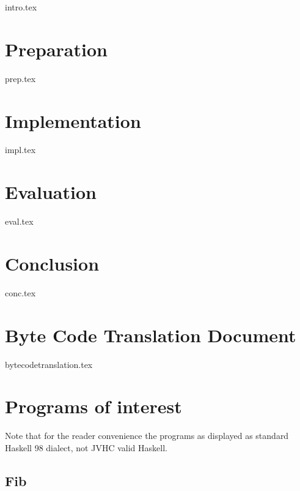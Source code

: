 \documentclass[12pt,a4paper,twoside,openright]{book}
\numberwithin{subcase}{case}
\begin{document}
{intro.tex}

\chapter{Preparation}

{prep.tex}

\chapter{Implementation}

{impl.tex}

\chapter{Evaluation}

{eval.tex}

\chapter{Conclusion}

{conc.tex}


\printbibliography

\appendix

\chapter{Byte Code Translation Document}

\label{appendix:bytecodetranslationdoc}

{bytecodetranslation.tex}

\chapter{Programs of interest}

Note that for the reader convenience the programs as displayed as standard
Haskell 98 dialect, not JVHC valid Haskell.

\section*{Fib}

\end{document}
